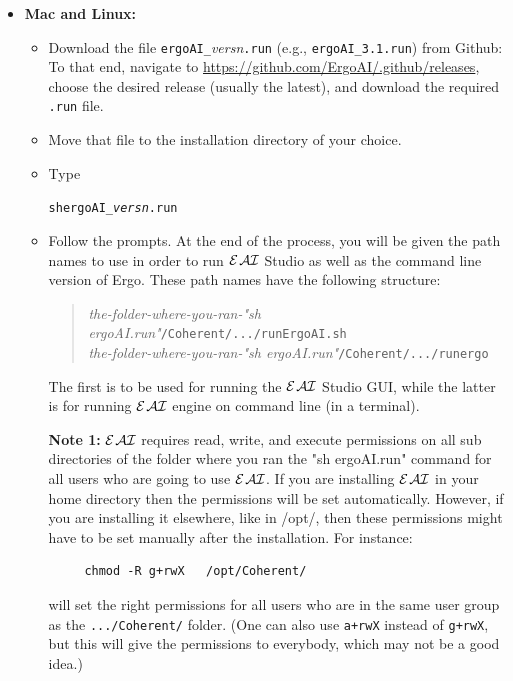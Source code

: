 \documentclass[11pt]{article}
\newcommand{\ERGOAI}{\mbox{{\ensuremath{\cal{E}}\smaller{{\sc{RGO}}}}\ensuremath{\cal{AI}}}\xspace}
\begin{document}
\begin{itemize}
\item[] \textbf{Mac and Linux:}  
  \begin{itemize}
  \item  Download the file \texttt{ergoAI\_}\textnormal{\textit{versn}}\texttt{.run}
    (e.g., \verb|ergoAI_3.1.run|) from Github:\\
    To that end, navigate to
    \url{https://github.com/ErgoAI/.github/releases}, 
    choose the desired release (usually the latest), and download the
    required \texttt{.run} file. 
  \item Move that file to the installation directory of your choice.
  \item Type
\begin{alltt}
    sh ergoAI\_\textnormal{\it{}versn}.run 
\end{alltt}
  \item Follow the prompts. At the end of the process, you will be given
    the path names to use in order to run \ERGOAI Studio as well as the
    command line version of Ergo. These path names have the following
    structure:
    \begin{quote}
      \emph{the-folder-where-you-ran-"sh ergoAI.run"}\texttt{/Coherent/.../runErgoAI.sh}\\
      \emph{the-folder-where-you-ran-"sh ergoAI.run"}\texttt{/Coherent/.../runergo}
    \end{quote}
    The first is to be used for running the \ERGOAI Studio GUI, while the
    latter is for running \ERGOAI engine on command line (in a terminal).

    \textbf{Note 1:} \ERGOAI requires read, write, and execute permissions
    on all sub directories of the folder where you ran the "sh ergoAI.run"
    command for all users who are going to use \ERGOAI. If
    you are installing \ERGOAI in your home directory then the permissions
    will be set automatically. However, if you are installing it elsewhere,
    like in /opt/, then these permissions might have to be set manually
    after the installation. For instance:
\begin{verbatim}
     chmod -R g+rwX   /opt/Coherent/ 
\end{verbatim}
    will set the right permissions for all users who are in the same user
    group as the \texttt{.../Coherent/} folder.  (One can also use
    \texttt{a+rwX} instead of \texttt{g+rwX}, but this will give the
    permissions to everybody, which may not be a good idea.)


\end{itemize}
\end{itemize}
\end{document}
